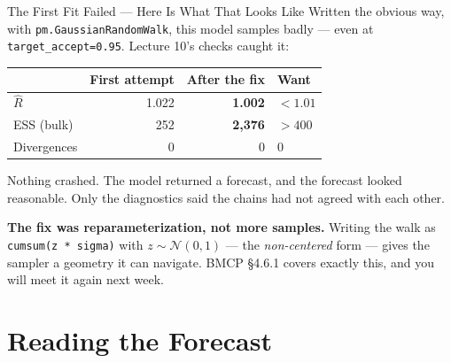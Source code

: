 \documentclass[aspectratio=169, 11pt]{beamer}
\begin{document}
\begin{frame}{The First Fit Failed --- Here Is What That Looks Like}
  Written the obvious way, with \texttt{pm.GaussianRandomWalk}, this model samples badly ---
  even at \texttt{target\_accept=0.95}. Lecture 10's checks caught it:
  \begin{center}
    {\small
    \begin{tabular}{lrrl}
      \toprule
      & \textbf{First attempt} & \textbf{After the fix} & \textbf{Want} \\
      \midrule
      $\hat{R}$ & 1.022 & \textbf{1.002} & $< 1.01$ \\
      ESS (bulk) & 252 & \textbf{2{,}376} & $> 400$ \\
      Divergences & 0 & 0 & $0$ \\
      \bottomrule
    \end{tabular}
    }
  \end{center}

  \vspace{-0.05cm}
  Nothing crashed. The model returned a forecast, and the forecast looked reasonable. Only the
  diagnostics said the chains had not agreed with each other.

  \begin{warningbox}
    \textbf{The fix was reparameterization, not more samples.} Writing the walk as
    \texttt{cumsum(z * sigma)} with $z \sim \mathcal{N}(0,1)$ --- the \emph{non-centered} form ---
    gives the sampler a geometry it can navigate. BMCP §4.6.1 covers exactly this, and you will
    meet it again next week.
  \end{warningbox}
\end{frame}

\section{Reading the Forecast}

\end{document}

